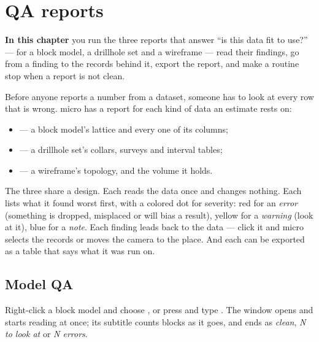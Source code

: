 \chapter{QA reports}\label{ch:qa}
\begin{goals}
\textbf{In this chapter} you run the three reports that answer “is this data fit to use?” — for a block model, a drillhole set and a wireframe — read their findings, go from a finding to the records behind it, export the report, and make a routine stop when a report is not clean.
\end{goals}

Before anyone reports a number from a dataset, someone has to look at every row that is wrong. micro has a report for each kind of data an estimate rests on:

\begin{itemize}
\item {} — a block model's lattice and every one of its columns;
\item {} — a drillhole set's collars, surveys and interval tables;
\item {} — a wireframe's topology, and the volume it holds.
\end{itemize}

The three share a design. Each reads the data once and changes nothing. Each lists what it found worst first, with a colored dot for severity: red for an \emph{error} (something is dropped, misplaced or will bias a result), yellow for a \emph{warning} (look at it), blue for a \emph{note}. Each finding leads back to the data — click it and micro selects the records or moves the camera to the place. And each can be exported as a table that says what it was run on.

\section{Model QA}\label{sec:qa-model}

Right-click a block model and choose , or press  and type . The window opens and starts reading at once; its subtitle counts blocks as it goes, and ends as \emph{clean}, \emph{N to look at} or \emph{N errors}.



